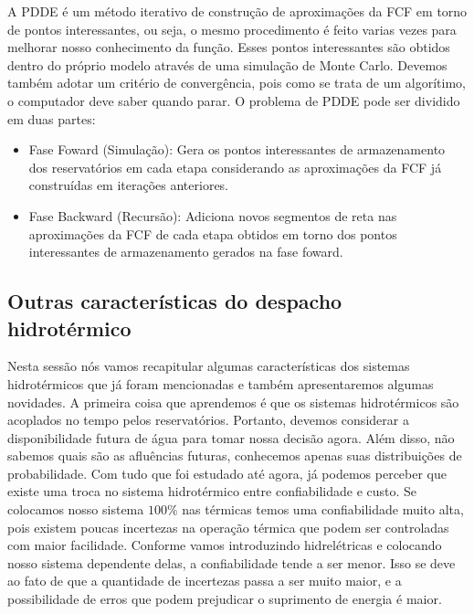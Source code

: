 A PDDE é um método iterativo de construção de aproximações da FCF em torno de pontos interessantes, ou seja, o mesmo procedimento é feito varias vezes para melhorar nosso conhecimento da função. Esses pontos interessantes são obtidos dentro do próprio modelo através de uma simulação de Monte Carlo. Devemos também adotar um critério de convergência, pois como se trata de um algorítimo, o computador deve saber quando parar. O problema de PDDE pode ser dividido em duas partes:

\begin{itemize}
\item Fase Foward (Simulação): Gera os pontos interessantes de armazenamento dos reservatórios em cada etapa considerando as aproximações da FCF já construídas em iterações anteriores.
\item Fase Backward (Recursão): Adiciona novos segmentos de reta nas aproximações da FCF de cada etapa obtidos em torno dos pontos interessantes de armazenamento gerados na fase foward. 
\end{itemize}


\subsection{Outras características do despacho hidrotérmico}

Nesta sessão nós vamos recapitular algumas características dos sistemas hidrotérmicos que já foram mencionadas e também apresentaremos algumas novidades. A primeira coisa que aprendemos é que os sistemas hidrotérmicos são acoplados no tempo pelos reservatórios. Portanto, devemos considerar a disponibilidade futura de água para tomar nossa decisão agora. Além disso, não sabemos quais são as afluências futuras, conhecemos apenas suas distribuições de probabilidade. Com tudo que foi estudado até agora, já podemos perceber que existe uma troca no sistema hidrotérmico entre confiabilidade e custo. Se colocamos nosso sistema $100\%$ nas térmicas temos uma confiabilidade muito alta, pois existem poucas incertezas na operação térmica que podem ser controladas com maior facilidade. Conforme vamos introduzindo hidrelétricas e colocando nosso sistema dependente delas, a confiabilidade tende a ser menor. Isso se deve ao fato de que a quantidade de incertezas passa a ser muito maior, e a possibilidade de erros que podem prejudicar o suprimento de energia é maior. 

